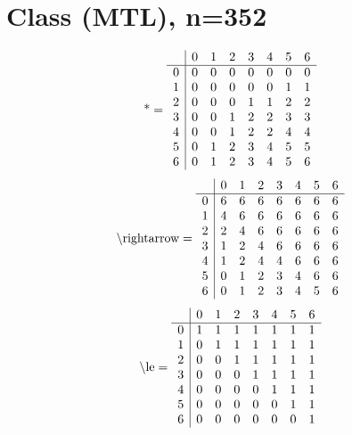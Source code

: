 \documentclass[11pt]{article}
\begin{document}
\section{Class (MTL), n=352}
\[\text{*} = 
\begin{array}{r | r r r r r r r}
 & 0 & 1 & 2 & 3 & 4 & 5 & 6 \\ \hline
0 & 0 & 0 & 0 & 0 & 0 & 0 & 0 \\
1 & 0 & 0 & 0 & 0 & 0 & 1 & 1 \\
2 & 0 & 0 & 0 & 1 & 1 & 2 & 2 \\
3 & 0 & 0 & 1 & 2 & 2 & 3 & 3 \\
4 & 0 & 0 & 1 & 2 & 2 & 4 & 4 \\
5 & 0 & 1 & 2 & 3 & 4 & 5 & 5 \\
6 & 0 & 1 & 2 & 3 & 4 & 5 & 6 \\
\end{array}
\]
\[\text{\textbackslash rightarrow} = 
\begin{array}{r | r r r r r r r}
 & 0 & 1 & 2 & 3 & 4 & 5 & 6 \\ \hline
0 & 6 & 6 & 6 & 6 & 6 & 6 & 6 \\
1 & 4 & 6 & 6 & 6 & 6 & 6 & 6 \\
2 & 2 & 4 & 6 & 6 & 6 & 6 & 6 \\
3 & 1 & 2 & 4 & 6 & 6 & 6 & 6 \\
4 & 1 & 2 & 4 & 4 & 6 & 6 & 6 \\
5 & 0 & 1 & 2 & 3 & 4 & 6 & 6 \\
6 & 0 & 1 & 2 & 3 & 4 & 5 & 6 \\
\end{array}
\]
\[\text{\textbackslash le} = 
\begin{array}{r | r r r r r r r}
 & 0 & 1 & 2 & 3 & 4 & 5 & 6 \\ \hline
0 & 1 & 1 & 1 & 1 & 1 & 1 & 1 \\
1 & 0 & 1 & 1 & 1 & 1 & 1 & 1 \\
2 & 0 & 0 & 1 & 1 & 1 & 1 & 1 \\
3 & 0 & 0 & 0 & 1 & 1 & 1 & 1 \\
4 & 0 & 0 & 0 & 0 & 1 & 1 & 1 \\
5 & 0 & 0 & 0 & 0 & 0 & 1 & 1 \\
6 & 0 & 0 & 0 & 0 & 0 & 0 & 1 \\
\end{array}
\]
\end{document}

